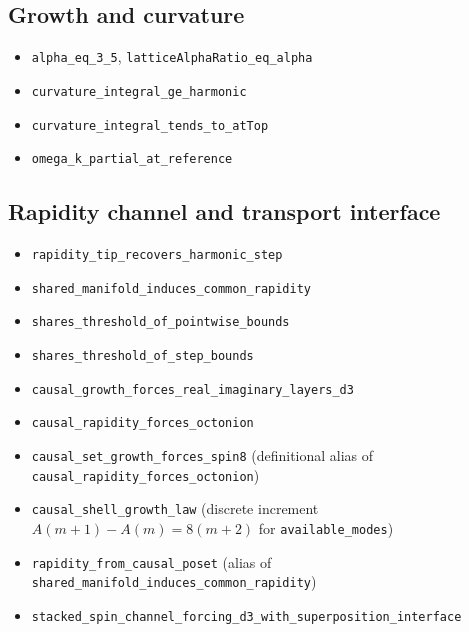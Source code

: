 \documentclass[11pt]{amsart}
\begin{document}
\subsection*{Growth and curvature}
\begin{itemize}
\item \texttt{alpha\_eq\_3\_5}, \texttt{latticeAlphaRatio\_eq\_alpha}
\item \texttt{curvature\_integral\_ge\_harmonic}
\item \texttt{curvature\_integral\_tends\_to\_atTop}
\item \texttt{omega\_k\_partial\_at\_reference}
\end{itemize}

\subsection*{Rapidity channel and transport interface}
\begin{itemize}
\item \texttt{rapidity\_tip\_recovers\_harmonic\_step}
\item \texttt{shared\_manifold\_induces\_common\_rapidity}
\item \texttt{shares\_threshold\_of\_pointwise\_bounds}
\item \texttt{shares\_threshold\_of\_step\_bounds}
\item \texttt{causal\_growth\_forces\_real\_imaginary\_layers\_d3}
\item \texttt{causal\_rapidity\_forces\_octonion}
\item \texttt{causal\_set\_growth\_forces\_spin8} (definitional alias of \texttt{causal\_rapidity\_forces\_octonion})
\item \texttt{causal\_shell\_growth\_law} (discrete increment \(A(m+1)-A(m)=8(m+2)\) for \texttt{available\_modes})
\item \texttt{rapidity\_from\_causal\_poset} (alias of \texttt{shared\_manifold\_induces\_common\_rapidity})
\item \texttt{stacked\_spin\_channel\_forcing\_d3\_with\_superposition\_interface}
\end{itemize}
\end{document}
